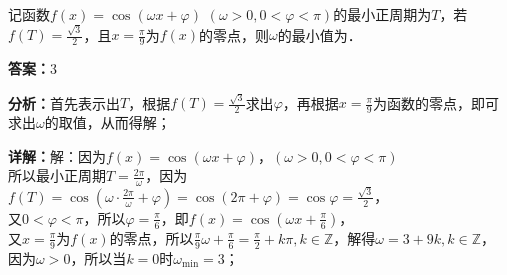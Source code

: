 \begin{question}[points=5]
记函数$f(x) = \cos(\omega x + \varphi)$ $(\omega > 0, 0 < \varphi < \pi)$的最小正周期为$T$，若$f(T) = \frac{\sqrt{3}}{2}$，且$x = \frac{\pi}{9}$为$f(x)$的零点，则$\omega$的最小值为．
\fillin[{$3$}]
\begin{solution}
\textbf{答案：}$3$

\textbf{分析：}首先表示出$T$，根据$f(T)=\frac{\sqrt{3}}{2}$求出$\varphi$，再根据$x=\frac{\pi}{9}$为函数的零点，即可求出$\omega$的取值，从而得解；

\textbf{详解：}解：因为$f(x)=\cos(\omega x+\varphi)$，$(\omega>0,0<\varphi<\pi)$\\所以最小正周期$T=\frac{2\pi}{\omega}$，因为$f(T)=\cos\left(\omega\cdot\frac{2\pi}{\omega}+\varphi\right)=\cos(2\pi+\varphi)=\cos\varphi=\frac{\sqrt{3}}{2}$，\\又$0<\varphi<\pi$，所以$\varphi=\frac{\pi}{6}$，即$f(x)=\cos\left(\omega x+\frac{\pi}{6}\right)$，\\又$x=\frac{\pi}{9}$为$f(x)$的零点，所以$\frac{\pi}{9}\omega+\frac{\pi}{6}=\frac{\pi}{2}+k\pi, k\in\mathbb{Z}$，解得$\omega=3+9k, k\in\mathbb{Z}$，\\因为$\omega>0$，所以当$k=0$时$\omega_{\min}=3$；
\end{solution}
\end{question}

